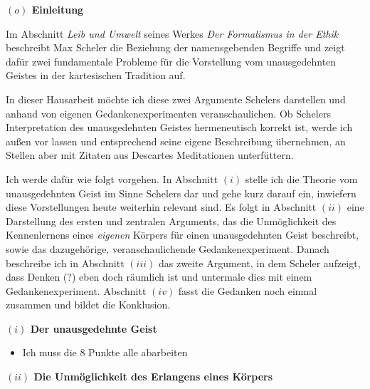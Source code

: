 \documentclass[a4paper, 12pt]{article}
\begin{document}
\begin{onehalfspace} 

\noindent\textbf{$(o)$ Einleitung}

\noindent Im Abschnitt \emph{Leib und Umwelt} seines Werkes \emph{Der Formalismus in der Ethik} beschreibt Max Scheler die Beziehung der namensgebenden Begriffe und zeigt dafür zwei fundamentale Probleme für die Vorstellung vom unausgedehnten Geistes in der kartesischen Tradition auf.

In dieser Hausarbeit möchte ich diese zwei Argumente Schelers darstellen und anhand von eigenen Gedankenexperimenten veranschaulichen. Ob Schelers Interpretation des unausgedehnten Geistes hermeneutisch korrekt ist, werde ich außen vor lassen und entsprechend seine eigene Beschreibung übernehmen, an Stellen aber mit Zitaten aus Descartes Meditationen unterfüttern. 

Ich werde dafür wie folgt vorgehen. In Abschnitt $(i)$ stelle ich die Theorie vom unausgedehnten Geist im Sinne Schelers dar und gehe kurz darauf ein, inwiefern diese Vorstellungen heute weiterhin relevant sind. Es folgt in Abschnitt $(ii)$ eine Darstellung des ersten und zentralen Arguments, das die Unmöglichkeit des Kennenlernens eines \emph{eigenen} Körpers für einen unausgedehnten Geist beschreibt, sowie das dazugehörige, veranschaulichende Gedankenexperiment. Danach beschreibe ich in Abschnitt $(iii)$ das zweite Argument, in dem Scheler aufzeigt, dass Denken (?) eben doch räumlich ist und untermale dies mit einem Gedankenexperiment. Abschnitt $(iv)$ fasst die Gedanken noch einmal zusammen und bildet die Konklusion.

\vspace{5mm}
\noindent\textbf{$(i)$ Der unausgedehnte Geist}

\begin{itemize}
  \item Ich muss die 8 Punkte alle abarbeiten
\end{itemize}


\vspace{5mm}
\noindent\textbf{$(ii)$ Die Unmöglichkeit des Erlangens eines Körpers}


\newpage

\end{onehalfspace}
\nocite{*}
\printbibliography
\end{document}
